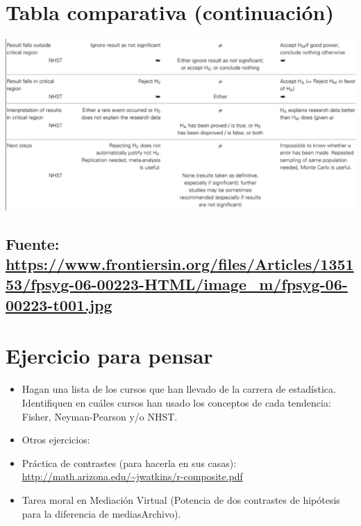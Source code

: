 \documentclass[
]{article}
\begin{document}
\hypertarget{tabla-comparativa-continuaciuxf3n-1}{%
\section{Tabla comparativa
(continuación)}\label{tabla-comparativa-continuaciuxf3n-1}}

\includegraphics{figs/tabla1.3.png}

\hypertarget{fuente-httpswww.frontiersin.orgfilesarticles135153fpsyg-06-00223-htmlimage_mfpsyg-06-00223-t001.jpg-1}{%
\subsection{\texorpdfstring{Fuente:
\url{https://www.frontiersin.org/files/Articles/135153/fpsyg-06-00223-HTML/image_m/fpsyg-06-00223-t001.jpg}}{Fuente: https://www.frontiersin.org/files/Articles/135153/fpsyg-06-00223-HTML/image\_m/fpsyg-06-00223-t001.jpg}}\label{fuente-httpswww.frontiersin.orgfilesarticles135153fpsyg-06-00223-htmlimage_mfpsyg-06-00223-t001.jpg-1}}

\hypertarget{ejercicio-para-pensar}{%
\section{Ejercicio para pensar}\label{ejercicio-para-pensar}}

\begin{itemize}
\item
  Hagan una lista de los cursos que han llevado de la carrera de
  estadística. Identifiquen en cuáles cursos han usado los conceptos de
  cada tendencia: Fisher, Neyman-Pearson y/o NHST.
\item
  Otros ejercicios:
\item
  Práctica de contrastes (para hacerla en sus casas):
  \url{http://math.arizona.edu/~jwatkins/r-composite.pdf}
\item
  Tarea moral en Mediación Virtual (Potencia de dos contrastes de
  hipótesis para la diferencia de mediasArchivo).
\end{itemize}
\end{document}
